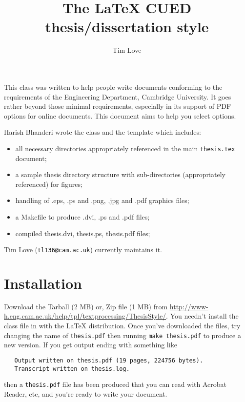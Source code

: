 \documentclass{article}
\title{The \LaTeX{} CUED thesis/dissertation style}
\author{Tim Love}
\begin{document}
\maketitle

This class was written to help people write documents conforming to the
requirements of the Engineering Department, Cambridge University. It
goes rather beyond those minimal requirements, especially in its support
of PDF options for online documents. This document aims to help you select
options.

Harish Bhanderi wrote the class and the template which includes:
\begin{itemize}
\item  all necessary directories appropriately referenced in the main \texttt{thesis.tex} document;
\item  a sample thesis directory structure with sub-directories (appropriately referenced) for figures;
\item  handling of .eps, .ps and .png, .jpg and .pdf graphics files;
\item  a Makefile to produce .dvi, .ps and .pdf files;
\item  compiled thesis.dvi, thesis.ps, thesis.pdf files;
\end{itemize}

Tim Love (\texttt{tl136@cam.ac.uk}) currently maintains it. 

\section{Installation}
Download the Tarball (2 MB) or, Zip file (1 MB) from
\url{http://www-h.eng.cam.ac.uk/help/tpl/textprocessing/ThesisStyle/}. 
You needn't install the class file in with the LaTeX distribution.
Once you've downloaded the files, try changing the name of \texttt{thesis.pdf} then running \texttt{make thesis.pdf}
to produce a new version. If you get output ending with something like
\begin{verbatim}
   Output written on thesis.pdf (19 pages, 224756 bytes).
   Transcript written on thesis.log.
\end{verbatim}
then a  \texttt{thesis.pdf} file has been produced that you can read with Acrobat Reader, etc, and you're ready to write your document. 
\end{document}

